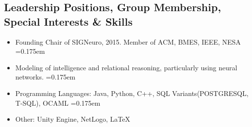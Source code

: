 \documentclass[10pt,letterpaper]{article}
\newenvironment{indentsection}[1]%
{\begin{list}{}%
	{\setlength{\leftmargin}{#1}}%
	\item[]%
}
{\end{list}}
\begin{document}
\subsection*{Leadership Positions, Group Membership, Special Interests \& Skills}

\begin{indentsection}{\parindent}
\begin{itemize}
	\parskip=0.175em
	\item
	Founding Chair of SIGNeuro, 2015. Member of ACM, BMES, IEEE, NESA
	\parskip=0.175em
	\item
	Modeling of intelligence and relational reasoning, particularly using neural networks. 
	\parskip=0.175em
	\item Programming Languages: Java, Python, C++, SQL Variants(POSTGRESQL, T-SQL), OCAML	
	\parskip=0.175em
	\item Other: Unity Engine, NetLogo, \LaTeX
\end{itemize}
\end{indentsection}
\end{document}
